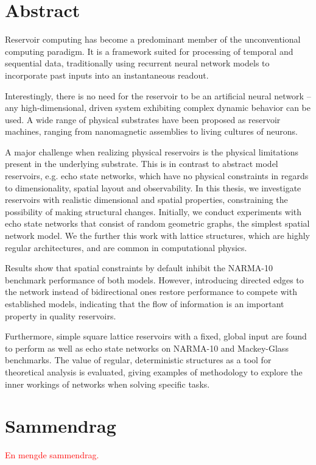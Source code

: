 \chapter*{Abstract}

Reservoir computing has become a predominant member of the unconventional
computing paradigm. It is a framework suited for processing of temporal and
sequential data, traditionally using recurrent neural network models to
incorporate past inputs into an instantaneous readout.

Interestingly, there is no need for the reservoir to be an artificial neural
network -- any high-dimensional, driven system exhibiting complex dynamic
behavior can be used. A wide range of physical substrates have been proposed as
reservoir machines, ranging from nanomagnetic assemblies to living cultures of
neurons.

A major challenge when realizing physical reservoirs is the physical limitations
present in the underlying substrate. This is in contrast to abstract model
reservoirs, e.g. echo state networks, which have no physical constraints in
regards to dimensionality, spatial layout and observability. In this thesis, we
investigate reservoirs with realistic dimensional and spatial properties,
constraining the possibility of making structural changes. Initially, we conduct
experiments with echo state networks that consist of random geometric graphs,
the simplest spatial network model. We the further this work with lattice
structures, which are highly regular architectures, and are common in
computational physics.

Results show that spatial constraints by default inhibit the NARMA-10 benchmark
performance of both models. However, introducing directed edges to the network
instead of bidirectional ones restore performance to compete with established
models, indicating that the flow of information is an important property in
quality reservoirs.

Furthermore, simple square lattice reservoirs with a fixed, global input are
found to perform as well as echo state networks on NARMA-10 and Mackey-Glass
benchmarks. The value of regular, deterministic structures as a tool for
theoretical analysis is evaluated, giving examples of methodology to explore the
inner workings of networks when solving specific tasks.

\chapter*{Sammendrag}

\textcolor{red}{
  En mengde sammendrag.
}


